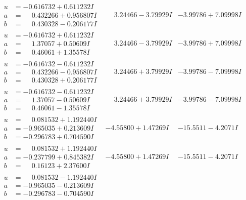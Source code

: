 \documentclass[1p]{elsarticle_modified}
\theoremstyle{definition}
\begin{document}
$$\begin{array}{c|c|c}
\begin{aligned}
u &= -0.616732 + 0.611232 I \\
a &= \phantom{-}0.432266 + 0.956807 I \\
b &= \phantom{-}0.430328 - 0.206177 I\end{aligned}
 & \phantom{-}3.24466 - 3.79929 I & -3.99786 + 7.09998 I \\ \hline\begin{aligned}
u &= -0.616732 + 0.611232 I \\
a &= \phantom{-}1.37057 + 0.50609 I \\
b &= \phantom{-}0.46061 + 1.35578 I\end{aligned}
 & \phantom{-}3.24466 - 3.79929 I & -3.99786 + 7.09998 I \\ \hline\begin{aligned}
u &= -0.616732 - 0.611232 I \\
a &= \phantom{-}0.432266 - 0.956807 I \\
b &= \phantom{-}0.430328 + 0.206177 I\end{aligned}
 & \phantom{-}3.24466 + 3.79929 I & -3.99786 - 7.09998 I \\ \hline\begin{aligned}
u &= -0.616732 - 0.611232 I \\
a &= \phantom{-}1.37057 - 0.50609 I \\
b &= \phantom{-}0.46061 - 1.35578 I\end{aligned}
 & \phantom{-}3.24466 + 3.79929 I & -3.99786 - 7.09998 I \\ \hline\begin{aligned}
u &= \phantom{-}0.081532 + 1.192440 I \\
a &= -0.965035 + 0.213609 I \\
b &= -0.296783 + 0.704590 I\end{aligned}
 & -4.55800 + 1.47269 I & -15.5511 - 4.2071 I \\ \hline\begin{aligned}
u &= \phantom{-}0.081532 + 1.192440 I \\
a &= -0.237799 + 0.845382 I \\
b &= \phantom{-}0.16123 + 2.37600 I\end{aligned}
 & -4.55800 + 1.47269 I & -15.5511 - 4.2071 I \\ \hline\begin{aligned}
u &= \phantom{-}0.081532 - 1.192440 I \\
a &= -0.965035 - 0.213609 I \\
b &= -0.296783 - 0.704590 I\end{aligned}

\end{array}$$
\end{document}
